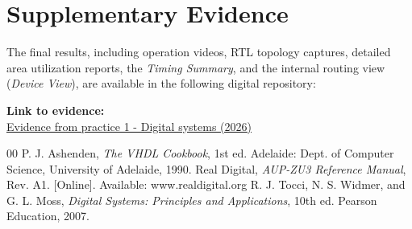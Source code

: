 \documentclass[conference]{IEEEtran}
\begin{document}
\section*{Supplementary Evidence}
The final results, including operation videos, RTL topology captures, detailed area utilization reports, the \textit{Timing Summary}, and the internal routing view (\textit{Device View}), are available in the following digital repository:
\vspace{0.15cm}

\noindent \textbf{Link to evidence:} \\ 
\href{https://alumnosuady-my.sharepoint.com/:f:/g/personal/a20203828_alumnos_uady_mx/IgDnrZ5xJ3o0Ro0kESO_Ny6PAYTKtLOJA-ll9GuFiGDVzH8?e=pBXB8s}{Evidence from practice 1 - Digital systems (2026)}

\begin{thebibliography}{00}
 P. J. Ashenden, \textit{The VHDL Cookbook}, 1st ed. Adelaide: Dept. of Computer Science, University of Adelaide, 1990.
 Real Digital, \textit{AUP-ZU3 Reference Manual}, Rev. A1. [Online]. Available: www.realdigital.org
 R. J. Tocci, N. S. Widmer, and G. L. Moss, \textit{Digital Systems: Principles and Applications}, 10th ed. Pearson Education, 2007.
\end{thebibliography}
\end{document}
